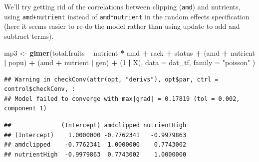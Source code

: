 \documentclass[
  12pt,
]{book}
\newenvironment{Shaded}{\begin{snugshade}}{\end{snugshade}}
\newcommand{\DataTypeTok}[1]{\textcolor[rgb]{0.13,0.29,0.53}{#1}}
\newcommand{\DecValTok}[1]{\textcolor[rgb]{0.00,0.00,0.81}{#1}}
\newcommand{\KeywordTok}[1]{\textcolor[rgb]{0.13,0.29,0.53}{\textbf{#1}}}
\newcommand{\NormalTok}[1]{#1}
\newcommand{\OperatorTok}[1]{\textcolor[rgb]{0.81,0.36,0.00}{\textbf{#1}}}
\newcommand{\StringTok}[1]{\textcolor[rgb]{0.31,0.60,0.02}{#1}}
\begin{document}
We'll try getting rid of the correlations between clipping (\texttt{amd}) and nutrients, using \texttt{amd+nutrient} instead of \texttt{amd*nutrient} in the random effects specification (here it seems easier to re-do the model rather than using update to add and subtract terms).

\begin{Shaded}
\begin{Highlighting}[]
\NormalTok{mp3 <-}\StringTok{ }\KeywordTok{glmer}\NormalTok{(total.fruits }\OperatorTok{~}\StringTok{ }\NormalTok{nutrient }\OperatorTok{*}\StringTok{ }\NormalTok{amd }\OperatorTok{+}
\StringTok{  }\NormalTok{rack }\OperatorTok{+}\StringTok{ }\NormalTok{status }\OperatorTok{+}
\StringTok{  }\NormalTok{(amd }\OperatorTok{+}\StringTok{ }\NormalTok{nutrient }\OperatorTok{|}\StringTok{ }\NormalTok{popu) }\OperatorTok{+}
\StringTok{  }\NormalTok{(amd }\OperatorTok{+}\StringTok{ }\NormalTok{nutrient }\OperatorTok{|}\StringTok{ }\NormalTok{gen) }\OperatorTok{+}\StringTok{ }\NormalTok{(}\DecValTok{1} \OperatorTok{|}\StringTok{ }\NormalTok{X),}
\DataTypeTok{data =}\NormalTok{ dat_tf, }\DataTypeTok{family =} \StringTok{"poisson"}
\NormalTok{)}
\end{Highlighting}
\end{Shaded}

\begin{verbatim}
## Warning in checkConv(attr(opt, "derivs"), opt$par, ctrl = control$checkConv, :
## Model failed to converge with max|grad| = 0.17819 (tol = 0.002, component 1)
\end{verbatim}

\begin{Shaded}
\end{Shaded}

\begin{verbatim}
##              (Intercept) amdclipped nutrientHigh
## (Intercept)    1.0000000 -0.7762341   -0.9979863
## amdclipped    -0.7762341  1.0000000    0.7743002
## nutrientHigh  -0.9979863  0.7743002    1.0000000
\end{verbatim}

\begin{Shaded}
\end{Shaded}
\end{document}
